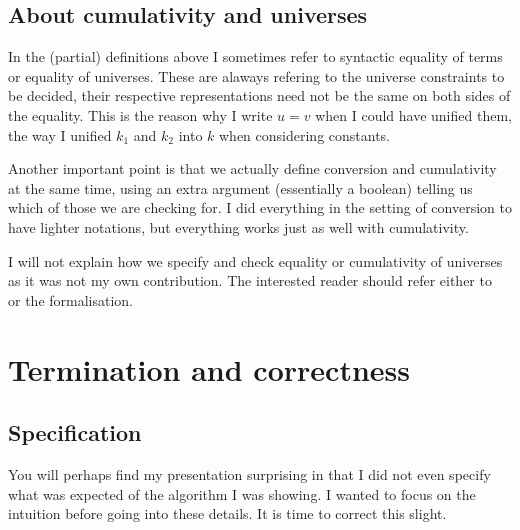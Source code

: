 \subsection{About cumulativity and universes}

In the (partial) definitions above I sometimes refer to syntactic equality of
terms or equality of universes. These are alaways refering to the universe
constraints to be decided, \ie their respective representations need not be the
same on both sides of the equality. This is the reason why I write \(u = v\)
when I could have unified them, the way I unified \(k_1\) and \(k_2\) into \(k\)
when considering constants.

Another important point is that we actually define conversion and cumulativity
at the same time, using an extra argument (essentially a boolean) telling us
which of those we are checking for.
I did everything in the setting of conversion to have lighter notations, but
everything works just as well with cumulativity.

I will not explain how we specify and check equality or cumulativity of
universes as it was not my own contribution.
The interested reader should refer either to~ or the
formalisation.

\section{Termination and correctness}

\subsection{Specification}

You will perhaps find my presentation surprising in that I did not even specify
what was expected of the algorithm I was showing. I wanted to focus on the
intuition before going into these details.
It is time to correct this slight.

